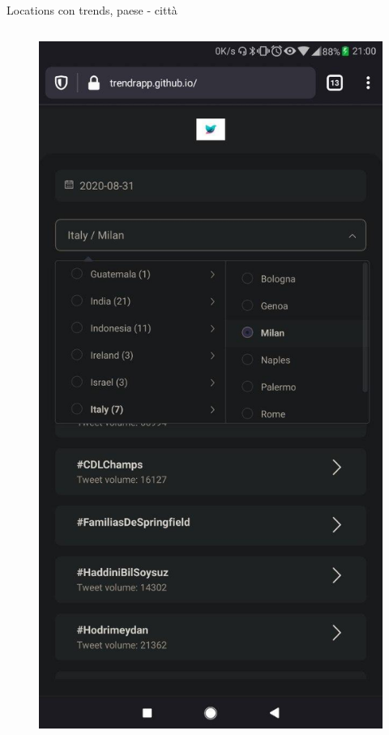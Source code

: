 \documentclass[xcolor=svgnames, aspectratio=169]{beamer}
\begin{document}
\begin{frame}{Locations con trends, paese - città}
\begin{columns}[t]
\begin{figure}[H]
            \includegraphics[width=0.32\paperwidth,height=0.7\paperheight,keepaspectratio]{Mobile_Firefox_Ricerca_Scelta_location_Italia_Milano.jpg}
        \end{figure}
        \vspace*{-12pt}

\end{columns}
\end{frame}
\end{document}
